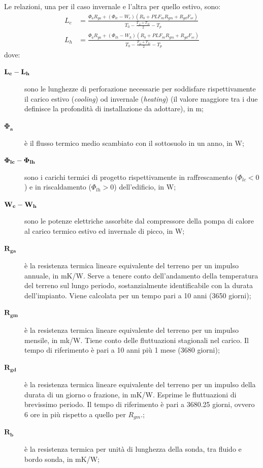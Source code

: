 Le relazioni, una per il caso invernale e l'altra per quello estivo, sono:
\begin{align}
	L_c&= \frac{\Phi_a R_{ga}+(\Phi_{lc}-W_{c})(R_b+PLF_mR_{gm}+R_{gd}F_{sc})}{T_0-\frac{T_{fi}+T_{fo}}{2}-T_p}\\
	L_h&= \frac{\Phi_a R_{ga}+(\Phi_{lh}-W_{h})(R_b+PLF_mR_{gm}+R_{gd}F_{sc})}{T_0-\frac{T_{fi}+T_{fo}}{2}-T_p}
\end{align}
dove:
\begin{description}
	\item[$\mathbf{L_c} \-- \mathbf{L_h}$] sono le lunghezze di perforazione necessarie per soddisfare rispettivamente il carico estivo (\emph{cooling}) od invernale (\emph{heating}) (il valore maggiore tra i due definisce la profondità di installazione da adottare), in \si{m};
	\item[$\mathbf{\Phi_a}$] è il flusso termico medio scambiato con il sottosuolo in un anno, in \si{W};
	\item[$\mathbf{\Phi_{lc}} \-- \mathbf{\Phi_{lh}}$] sono i carichi termici di progetto rispettivamente in raffrescamento ($\Phi_{lc}<0$) e in riscaldamento ($\Phi_{lh}>0$) dell'edificio, in \si{W};
	\item[$\mathbf{W_c} \-- \mathbf{W_h}$] sono le potenze elettriche assorbite dal compressore della pompa di calore al carico termico estivo ed invernale di picco, in \si{W};
	\item[$\mathbf{R_{ga}}$] è la resistenza termica lineare equivalente del terreno per un impulso annuale, in \si{mK/W}. Serve a tenere conto dell'andamento della temperatura del terreno sul lungo periodo, sostanzialmente identificabile con la durata dell'impianto. Viene calcolata per un tempo pari a \num{10} anni (\num{3650} giorni);
	\item[$\mathbf{R_{gm}}$] è la resistenza termica lineare equivalente del terreno per un impulso mensile, in \si{mk/W}. Tiene conto delle fluttuazioni stagionali nel carico. Il tempo di riferimento è pari a \num{10} anni più \num{1} mese (\num{3680} giorni);
	\item[$\mathbf{R_{gd}}$] è la resistenza termica lineare equivalente del terreno per un impulso della durata di un giorno o frazione, in \si{mK/W}. Esprime le fluttuazioni di brevissimo periodo. Il tempo di riferimento è pari a \num{3680.25} giorni, ovvero \num{6} ore in più rispetto a quello per $R_{gm}$.;
	\item[$\mathbf{R_b}$] è la resistenza termica per unità di lunghezza della sonda, tra fluido e bordo sonda, in \si{mK/W};

\end{description}
